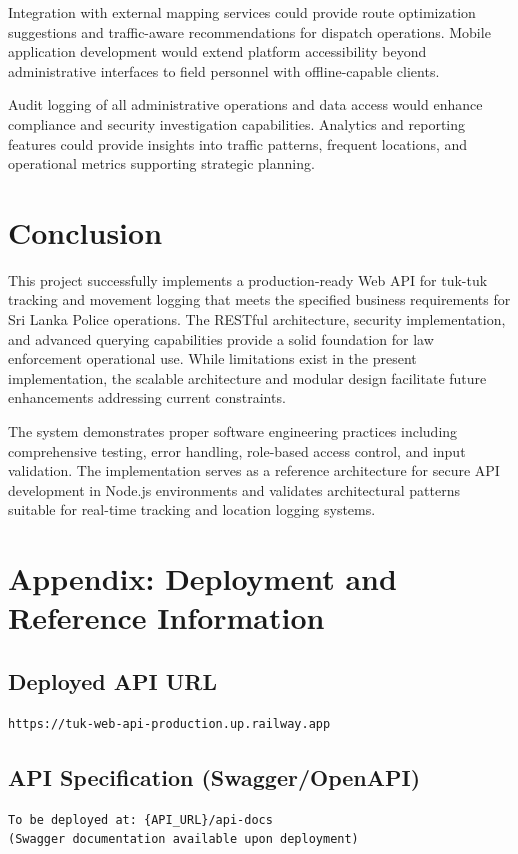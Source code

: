 \documentclass[12pt,a4paper]{article}
\begin{document}
Integration with external mapping services could provide route optimization suggestions and traffic-aware recommendations for dispatch operations. Mobile application development would extend platform accessibility beyond administrative interfaces to field personnel with offline-capable clients.

Audit logging of all administrative operations and data access would enhance compliance and security investigation capabilities. Analytics and reporting features could provide insights into traffic patterns, frequent locations, and operational metrics supporting strategic planning.

\section{Conclusion}

This project successfully implements a production-ready Web API for tuk-tuk tracking and movement logging that meets the specified business requirements for Sri Lanka Police operations. The RESTful architecture, security implementation, and advanced querying capabilities provide a solid foundation for law enforcement operational use. While limitations exist in the present implementation, the scalable architecture and modular design facilitate future enhancements addressing current constraints.

The system demonstrates proper software engineering practices including comprehensive testing, error handling, role-based access control, and input validation. The implementation serves as a reference architecture for secure API development in Node.js environments and validates architectural patterns suitable for real-time tracking and location logging systems.

\newpage
\section*{Appendix: Deployment and Reference Information}

\subsection*{Deployed API URL}
\begin{verbatim}
https://tuk-web-api-production.up.railway.app
\end{verbatim}

\subsection*{API Specification (Swagger/OpenAPI)}
\begin{verbatim}
To be deployed at: {API_URL}/api-docs
(Swagger documentation available upon deployment)
\end{verbatim}
\end{document}
